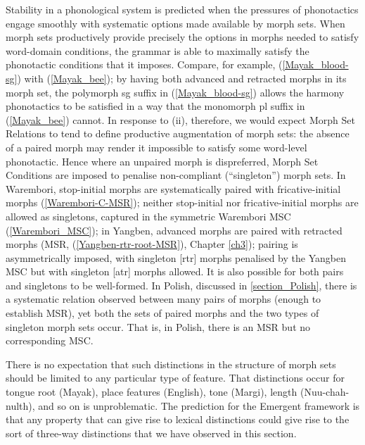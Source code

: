 Stability in a phonological system is predicted when the pressures of phonotactics engage smoothly with systematic options made available by morph sets. When morph sets productively provide precisely the options in morphs needed to satisfy word-domain conditions, the grammar is able to maximally satisfy the phonotactic conditions that it imposes. Compare, for example, (\ref{Mayak_blood-sg}) with (\ref{Mayak_bee}); by having both advanced and retracted morphs in its morph set, the polymorph {\sc sg} suffix in (\ref{Mayak_blood-sg}) allows the harmony phonotactics to be satisfied in a way that the monomorph {\sc pl} suffix in (\ref{Mayak_bee})  cannot. In response to (ii), therefore, we would expect Morph Set Relations to tend to define productive augmentation of morph sets: the absence of a paired morph may render it impossible to satisfy some word-level phonotactic. Hence where an unpaired morph is dispreferred, Morph Set Conditions are imposed to penalise non-compliant (``singleton'') morph sets. In Warembori, stop-initial morphs are systematically paired with fricative-initial morphs (\ref{Warembori-C-MSR}); neither stop-initial nor fricative-initial morphs are allowed as singletons, captured in the symmetric Warembori MSC (\ref{Warembori_MSC}); in Yangben, advanced morphs are paired with retracted morphs (MSR\down{\sc [tr]}, (\ref{Yangben-rtr-root-MSR}), Chapter \ref{ch3}); pairing is asymmetrically imposed, with singleton [rtr] morphs penalised by the Yangben MSC\down{\sc [tr]} but with singleton [atr] morphs allowed. It is also possible for both pairs and singletons to be well-formed. In Polish, discussed in \Sec\ref{section_Polish},  there is a systematic relation observed between many pairs of morphs (enough to establish MSR), yet both the sets of paired morphs and the two types of singleton morph sets occur. That is, in Polish, there is an MSR but no corresponding MSC.



There is no expectation that such distinctions in the structure of morph sets should be limited to any particular type of feature. That  distinctions occur for tongue root (Mayak), place features (English), tone (Margi), length (Nuu-chah-nulth), and so on is unproblematic. The prediction for the Emergent framework is that any property that can give rise to lexical distinctions could give rise to the sort of three-way distinctions that we have observed in this section. 


